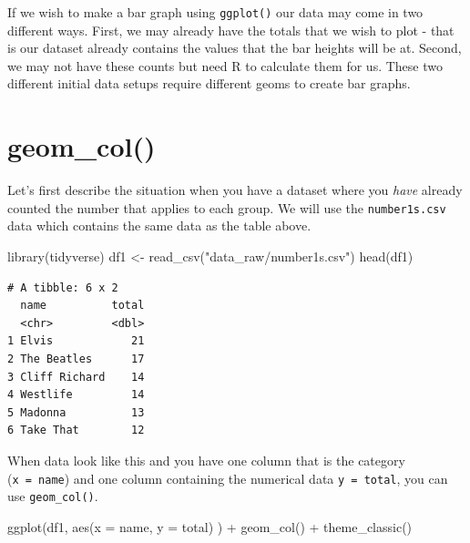 \documentclass[
  letterpaper,
  DIV=11,
  numbers=noendperiod]{scrreprt}
\newenvironment{Shaded}{\begin{snugshade}}{\end{snugshade}}
\newcommand{\AttributeTok}[1]{\textcolor[rgb]{0.40,0.45,0.13}{#1}}
\newcommand{\FunctionTok}[1]{\textcolor[rgb]{0.28,0.35,0.67}{#1}}
\newcommand{\NormalTok}[1]{\textcolor[rgb]{0.00,0.23,0.31}{#1}}
\newcommand{\OtherTok}[1]{\textcolor[rgb]{0.00,0.23,0.31}{#1}}
\newcommand{\SpecialCharTok}[1]{\textcolor[rgb]{0.37,0.37,0.37}{#1}}
\newcommand{\StringTok}[1]{\textcolor[rgb]{0.13,0.47,0.30}{#1}}
\begin{document}
If we wish to make a bar graph using \texttt{ggplot()} our data may come
in two different ways. First, we may already have the totals that we
wish to plot - that is our dataset already contains the values that the
bar heights will be at. Second, we may not have these counts but need R
to calculate them for us. These two different initial data setups
require different geoms to create bar graphs.

\hypertarget{geom_col}{%
\section{\texorpdfstring{\textbf{geom\_col()}}{geom\_col()}}\label{geom_col}}

Let's first describe the situation when you have a dataset where you
\emph{have} already counted the number that applies to each group. We
will use the \texttt{number1s.csv} data which contains the same data as
the table above.

\begin{Shaded}
\begin{Highlighting}[]
\FunctionTok{library}\NormalTok{(tidyverse)}
\NormalTok{df1 }\OtherTok{\textless{}{-}} \FunctionTok{read\_csv}\NormalTok{(}\StringTok{"data\_raw/number1s.csv"}\NormalTok{)}
\FunctionTok{head}\NormalTok{(df1)}
\end{Highlighting}
\end{Shaded}

\begin{verbatim}
# A tibble: 6 x 2
  name          total
  <chr>         <dbl>
1 Elvis            21
2 The Beatles      17
3 Cliff Richard    14
4 Westlife         14
5 Madonna          13
6 Take That        12
\end{verbatim}

When data look like this and you have one column that is the category
(\texttt{x\ =\ name}) and one column containing the numerical data
\texttt{y\ =\ total}, you can use \texttt{geom\_col()}.

\begin{Shaded}
\begin{Highlighting}[]
\FunctionTok{ggplot}\NormalTok{(df1, }\FunctionTok{aes}\NormalTok{(}\AttributeTok{x =}\NormalTok{ name, }\AttributeTok{y =}\NormalTok{ total) ) }\SpecialCharTok{+} 
  \FunctionTok{geom\_col}\NormalTok{() }\SpecialCharTok{+}
  \FunctionTok{theme\_classic}\NormalTok{()}
\end{Highlighting}
\end{Shaded}
\end{document}
